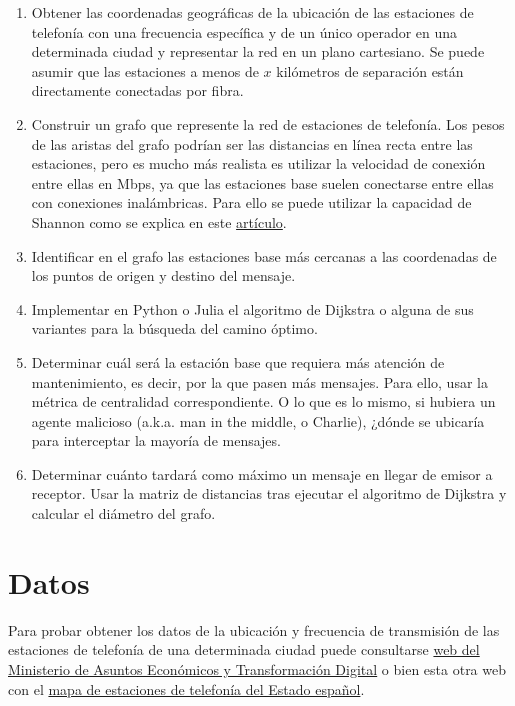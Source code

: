 \documentclass[
  a4paper,
]{scrreport}
\providecommand{\tightlist}{%
  \setlength{\itemsep}{0pt}\setlength{\parskip}{0pt}}\usepackage{longtable,booktabs,array}
\begin{document}
\begin{enumerate}
\def\labelenumi{\arabic{enumi}.}
\tightlist
\item
  Obtener las coordenadas geográficas de la ubicación de las estaciones
  de telefonía con una frecuencia específica y de un único operador en
  una determinada ciudad y representar la red en un plano cartesiano. Se
  puede asumir que las estaciones a menos de \(x\) kilómetros de
  separación están directamente conectadas por fibra.
\item
  Construir un grafo que represente la red de estaciones de telefonía.
  Los pesos de las aristas del grafo podrían ser las distancias en línea
  recta entre las estaciones, pero es mucho más realista es utilizar la
  velocidad de conexión entre ellas en Mbps, ya que las estaciones base
  suelen conectarse entre ellas con conexiones inalámbricas. Para ello
  se puede utilizar la capacidad de Shannon como se explica en este
  \href{https://dspace.networks.imdea.org/bitstream/handle/20.500.12761/689/main_Throughput_MiSARN2019_CameraReady_Embedded_CertifiedIEEEeXplore.pdf?sequence=1}{artículo}.
\item
  Identificar en el grafo las estaciones base más cercanas a las
  coordenadas de los puntos de origen y destino del mensaje.
\item
  Implementar en Python o Julia el algoritmo de Dijkstra o alguna de sus
  variantes para la búsqueda del camino óptimo.
\item
  Determinar cuál será la estación base que requiera más atención de
  mantenimiento, es decir, por la que pasen más mensajes. Para ello,
  usar la métrica de centralidad correspondiente. O lo que es lo mismo,
  si hubiera un agente malicioso (a.k.a. man in the middle, o Charlie),
  ¿dónde se ubicaría para interceptar la mayoría de mensajes.
\item
  Determinar cuánto tardará como máximo un mensaje en llegar de emisor a
  receptor. Usar la matriz de distancias tras ejecutar el algoritmo de
  Dijkstra y calcular el diámetro del grafo.
\end{enumerate}

\hypertarget{datos}{%
\section{Datos}\label{datos}}

Para probar obtener los datos de la ubicación y frecuencia de
transmisión de las estaciones de telefonía de una determinada ciudad
puede consultarse
\href{https://geoportal.minetur.gob.es/VCTEL/vcne.do}{web del Ministerio
de Asuntos Económicos y Transformación Digital} o bien esta otra web con
el \href{https://antenasgsm.com/}{mapa de estaciones de telefonía del
Estado español}.
\end{document}
